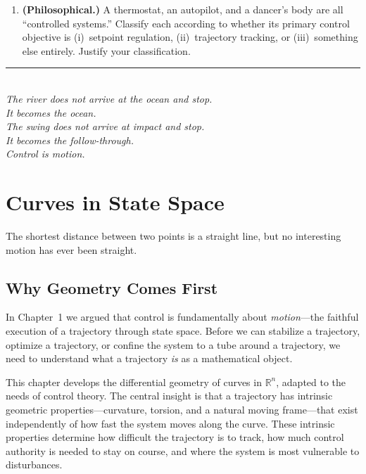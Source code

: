 \documentclass[12pt, openany]{book}
\theoremstyle{plain}
\newcommand{\Reals}{\mathbb{R}}
\begin{document}
\begin{enumerate}[label=\textbf{1.\arabic*.}, leftmargin=1.5cm]
\item \textbf{(Philosophical.)} A thermostat, an autopilot, and a dancer's body
  are all ``controlled systems.'' Classify each according to whether its primary
  control objective is (i)~setpoint regulation, (ii)~trajectory tracking, or
  (iii)~something else entirely. Justify your classification.

\end{enumerate}

\vspace{1cm}
\begin{center}
  \rule{0.5\textwidth}{0.4pt}\\[0.5cm]
  {\small\itshape
  The river does not arrive at the ocean and stop.\\
  It becomes the ocean.\\
  The swing does not arrive at impact and stop.\\
  It becomes the follow-through.\\[0.3cm]
  Control is motion.}
\end{center}

\chapter{Curves in State Space}

\epigraph{%
  The shortest distance between two points is a straight line,
  but no interesting motion has ever been straight.
}{}

\vspace{0.5cm}

\section{Why Geometry Comes First}

In Chapter~1 we argued that control is fundamentally about \emph{motion}---the
faithful execution of a trajectory through state space. Before we can stabilize
a trajectory, optimize a trajectory, or confine the system to a tube around a
trajectory, we need to understand what a trajectory \emph{is} as a mathematical
object.

This chapter develops the differential geometry of curves in $\Reals^n$, adapted
to the needs of control theory. The central insight is that a trajectory has
intrinsic geometric properties---curvature, torsion, and a natural moving
frame---that exist independently of how fast the system moves along the curve.
These intrinsic properties determine how difficult the trajectory is to track,
how much control authority is needed to stay on course, and where the system
is most vulnerable to disturbances.
\end{document}
